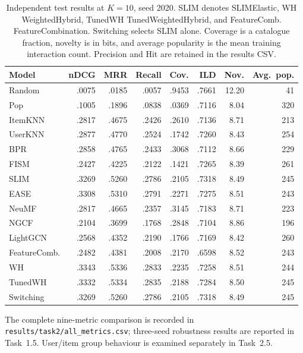 \documentclass[12pt,a4paper]{article}   %
\begin{document}
\begin{table}[H]
\centering
\begingroup
\setlength{\tabcolsep}{3pt}
\begin{tabular}{@{}lrrrrrrr@{}}
\toprule
Model & nDCG & MRR & Recall & Cov. & ILD & Nov. & Avg.~pop. \\
\midrule
Random & .0075 & .0185 & .0057 & .9453 & .7661 & 12.20 & 41 \\
Pop & .1005 & .1896 & .0838 & .0369 & .7116 & 8.04 & 320 \\
ItemKNN & .2817 & .4675 & .2426 & .2610 & .7136 & 8.71 & 213 \\
UserKNN & .2877 & .4770 & .2524 & .1742 & .7260 & 8.43 & 254 \\
BPR & .2858 & .4765 & .2433 & .3068 & .7112 & 8.66 & 229 \\
FISM & .2427 & .4225 & .2122 & .1421 & .7265 & 8.39 & 261 \\
SLIM & .3269 & .5260 & .2786 & .2105 & .7318 & 8.49 & 245 \\
EASE & .3308 & .5310 & .2791 & .2271 & .7275 & 8.51 & 243 \\
NeuMF & .2817 & .4665 & .2357 & .3145 & .7183 & 8.71 & 223 \\
NGCF & .2104 & .3699 & .1768 & .2848 & .7104 & 8.86 & 196 \\
LightGCN & .2568 & .4352 & .2190 & .1766 & .7169 & 8.42 & 260 \\
FeatureComb. & .2482 & .4381 & .2008 & .2170 & .6598 & 8.52 & 243 \\
WH & .3343 & .5336 & .2833 & .2235 & .7258 & 8.51 & 244 \\
TunedWH & .3332 & .5334 & .2835 & .2188 & .7284 & 8.50 & 245 \\
Switching & .3269 & .5260 & .2786 & .2105 & .7318 & 8.49 & 245 \\
\bottomrule
\end{tabular}
\endgroup
\caption{Independent test results at $K=10$, seed 2020. SLIM denotes SLIMElastic, WH WeightedHybrid, TunedWH TunedWeightedHybrid, and FeatureComb. FeatureCombination. Switching selects SLIM alone. Coverage is a catalogue fraction, novelty is in bits, and average popularity is the mean training interaction count. Precision and Hit are retained in the results CSV.}
\label{tab:task2}
\end{table}

The complete nine-metric comparison is recorded in \texttt{results/task2/all\_metrics.csv}; three-seed robustness results are reported in Task~1.5. User/item group behaviour is examined separately in Task~2.5.
\end{document}
